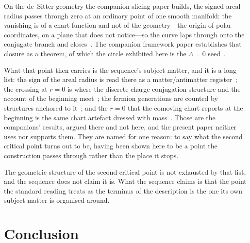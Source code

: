 \documentclass[11pt,a4paper]{article}
\theoremstyle{definition}
\begin{document}
On the de~Sitter geometry the companion slicing paper builds, the signed areal radius passes through zero at an ordinary point of one smooth manifold: the vanishing is of a chart function and not of the geometry---the origin of polar coordinates, on a plane that does not notice---so the curve laps through onto the conjugate branch and closes~\cite{JanzenSlicing}. The companion framework paper establishes that closure as a theorem, of which the circle exhibited here is the $\Lambda=0$ seed~\cite{JanzenCRframework}.

What that point then carries is the sequence's subject matter, and it is a long list: the sign of the areal radius is read there as a matter/antimatter register~\cite{JanzenGroupoid,JanzenAlgebroid}; the crossing at $r=0$ is where the discrete charge-conjugation structure and the account of the beginning meet~\cite{JanzenBoundary}; the fermion generations are counted by structures anchored to it~\cite{JanzenMatter}; and the $r=0$ that the comoving chart reports at the beginning is the same chart artefact dressed with mass~\cite{JanzenOperator}. Those are the companions' results, argued there and not here, and the present paper neither uses nor supports them. They are named for one reason: to say what the second critical point turns out to be, having been shown here to be a point the construction passes through rather than the place it stops.

The geometric structure of the second critical point is not exhausted by that list, and the sequence does not claim it is. What the sequence claims is that the point the standard reading treats as the terminus of the description is the one its own subject matter is organised around.

\section{Conclusion}
\end{document}
